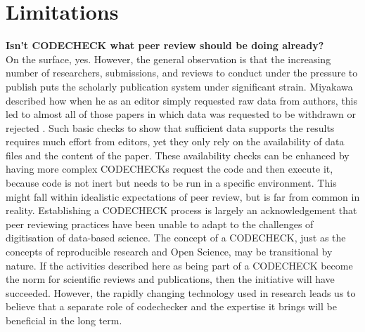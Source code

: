 \documentclass[12pt]{article}
\begin{document}
\section*{Limitations}\label{limitations}

\textbf{Isn't CODECHECK what peer review should be doing already?} \\
On the surface, yes.
However, the general observation is that the
increasing number of researchers, submissions, and reviews to conduct
under the pressure to publish puts the scholarly publication system
under significant strain.
Miyakawa described how when he as an editor simply requested raw data from authors, this led to almost all of those papers in which data was requested to be withdrawn or rejected \cite{miyakawa_no_2020}.
Such basic checks to show that
sufficient data supports the results requires much effort from editors,
yet they only rely on the availability of data files and the content of the
paper.
These availability checks can be enhanced by having more complex CODECHECKs request the code and then execute it, because code is not inert but needs to be run in a specific environment.
This might fall within idealistic expectations of peer review,
but is far from common in reality.
Establishing a CODECHECK
process is largely an acknowledgement that peer reviewing practices
have been unable to adapt to the challenges of digitisation of data-based science.
The concept of a CODECHECK,
just as the concepts of reproducible research and Open Science,
may be transitional by nature. If the activities described here as
being part of a CODECHECK become the norm for scientific reviews and
publications, then the initiative will have succeeded. However, the
rapidly changing technology used in research leads us to believe that
a separate role of codechecker and the expertise it brings will be
beneficial in the long term.

\newpage
\end{document}
